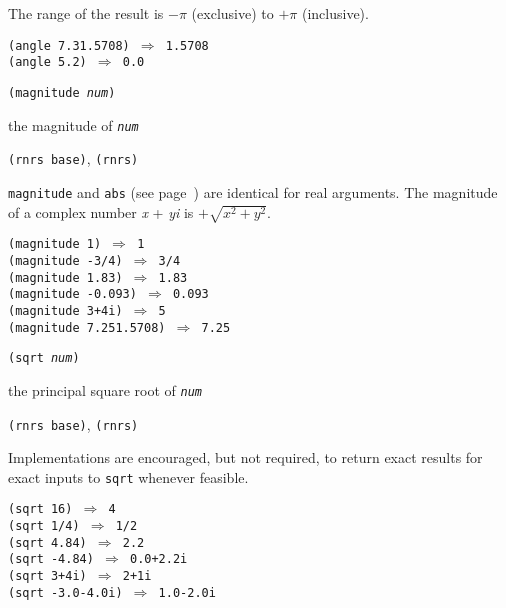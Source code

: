 The range of the result is \(-\pi\) (exclusive) to \(+\pi\) (inclusive).


\begin{alltt}
(angle 7.3\@{}1.5708) \(\Rightarrow\) 1.5708
(angle 5.2) \(\Rightarrow\) 0.0
\end{alltt}

\begin{description}

\label{objects_s125}\label{objects_page_magnitude}
\item[procedure] \texttt{(magnitude \textit{num})}



\item[returns] the magnitude of \texttt{\textit{num}}


\item[libraries] \texttt{(rnrs base)}, \texttt{(rnrs)}
\end{description}

\texttt{magnitude} and \label{objects_s126}\texttt{abs}
(see page \pageref{objects_page_abs}) are identical for real arguments.
The magnitude of a complex number \textit{x} + \textit{yi} is
\(+\sqrt{x^2+y^2}\).

\begin{alltt}
(magnitude 1) \(\Rightarrow\) 1
(magnitude -3/4) \(\Rightarrow\) 3/4
(magnitude 1.83) \(\Rightarrow\) 1.83
(magnitude -0.093) \(\Rightarrow\) 0.093
(magnitude 3+4i) \(\Rightarrow\) 5
(magnitude 7.25\@{}1.5708) \(\Rightarrow\) 7.25
\end{alltt}

\begin{description}

\label{objects_s127}\item[procedure] \texttt{(sqrt \textit{num})}



\item[returns] the principal square root of \texttt{\textit{num}}


\item[libraries] \texttt{(rnrs base)}, \texttt{(rnrs)}
\end{description}


Implementations are encouraged, but not required, to return exact
results for exact inputs to \texttt{sqrt} whenever feasible.


\begin{alltt}
(sqrt 16) \(\Rightarrow\) 4
(sqrt 1/4) \(\Rightarrow\) 1/2
(sqrt 4.84) \(\Rightarrow\) 2.2
(sqrt -4.84) \(\Rightarrow\) 0.0+2.2i
(sqrt 3+4i) \(\Rightarrow\) 2+1i
(sqrt -3.0-4.0i) \(\Rightarrow\) 1.0-2.0i
\end{alltt}

